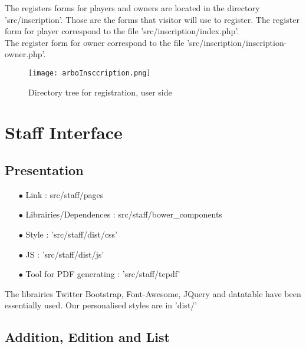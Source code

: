 \documentclass{article}
\begin{document}
The registers forms for players and owners are located in the directory 'src/inscription'. Those are the forms that visitor will use to register.
The register form for player correspond to the file 'src/inscription/index.php'.\\
The register form for owner correspond to the file 'src/inscription/inscription-owner.php'.\\

\begin{figure}[H]
\centering
\texttt{[image: arboInsccription.png]}
\caption{Directory tree for registration, user side}
\end{figure}


\section{Staff Interface}

\subsection{Presentation}

\begin{itemize}
\item[$\bullet$] Link : src/staff/pages
\item[$\bullet$] Librairies/Dependences : src/staff/bower\_components
\item[$\bullet$] Style : 'src/staff/dist/css'
\item[$\bullet$] JS : 'src/staff/dist/js'
\item[$\bullet$] Tool for PDF generating : 'src/staff/tcpdf'
\end{itemize}

The librairies Twitter Bootstrap, Font-Awesome, JQuery and datatable have been essentially used.
Our personalised styles are in 'dist/'

\subsection{Addition, Edition and List}
\end{document}
